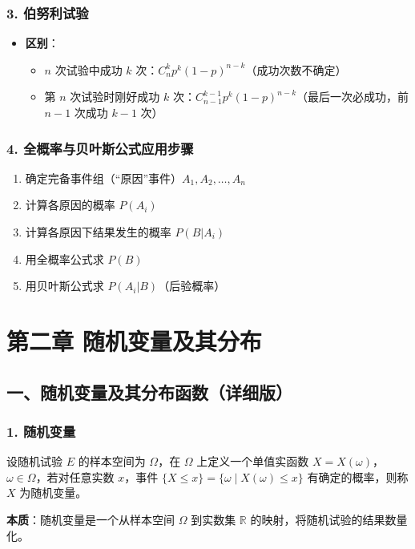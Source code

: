 \documentclass[12pt,a4paper]{ctexart}
\begin{document}
\subsubsection{3. 伯努利试验}
\begin{itemize}[noitemsep]
    \item \textbf{区别}：
          \begin{itemize}[noitemsep]
              \item $n$ 次试验中成功 $k$ 次：$C_n^k p^k (1-p)^{n-k}$（成功次数不确定）
              \item 第 $n$ 次试验时刚好成功 $k$ 次：$C_{n-1}^{k-1} p^k (1-p)^{n-k}$（最后一次必成功，前 $n-1$ 次成功 $k-1$ 次）
          \end{itemize}
\end{itemize}

\subsubsection{4. 全概率与贝叶斯公式应用步骤}
\begin{enumerate}[noitemsep]
    \item 确定完备事件组（“原因”事件）$A_1, A_2, \dots, A_n$
    \item 计算各原因的概率 $P(A_i)$
    \item 计算各原因下结果发生的概率 $P(B|A_i)$
    \item 用全概率公式求 $P(B)$
    \item 用贝叶斯公式求 $P(A_i|B)$（后验概率）
\end{enumerate}

\newpage
\section{第二章 随机变量及其分布}

\subsection{一、随机变量及其分布函数（详细版）}

\subsubsection{1. 随机变量}
设随机试验 $E$ 的样本空间为 $\Omega$，在 $\Omega$ 上定义一个单值实函数 $X = X(\omega)$，$\omega \in \Omega$，若对任意实数 $x$，事件 $\{X \le x\} = \{\omega \mid X(\omega) \le x\}$ 有确定的概率，则称 $X$ 为随机变量。

\textbf{本质}：随机变量是一个从样本空间 $\Omega$ 到实数集 $\mathbb{R}$ 的映射，将随机试验的结果数量化。
\end{document}
